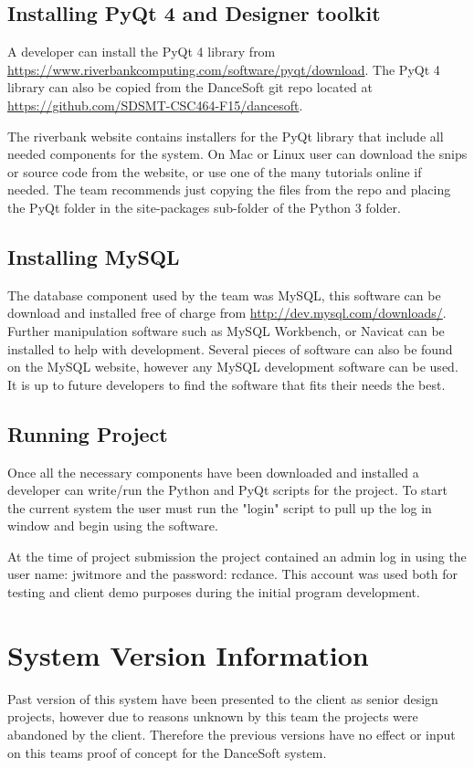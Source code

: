 \subsection{Installing PyQt 4 and Designer toolkit }

A developer can install the PyQt 4 library from \url{https://www.riverbankcomputing.com/software/pyqt/download}. The PyQt 4 library can also be copied from the DanceSoft git repo located at \url{https://github.com/SDSMT-CSC464-F15/dancesoft}.

The riverbank website contains installers for the PyQt library that include all needed components for the system. On Mac or Linux user can download the snips or source code from the website, or use one of the many tutorials online if needed. The team recommends just copying the files from the repo and placing the PyQt folder in the site-packages sub-folder of the Python 3 folder. 

\subsection{Installing MySQL}
The database component used by the team was MySQL, this software can be download and installed free of charge from \url{http://dev.mysql.com/downloads/}. Further manipulation software such as MySQL Workbench, or Navicat can be installed to help with development. Several pieces of  software can also be found on the MySQL website, however any MySQL development software can be used. It is up to future developers to find the software that fits their needs the best.

\subsection{Running Project}
Once all the necessary components have been downloaded and installed a developer can write/run the Python and PyQt scripts for the project. To start the current system the user must run the "login" script to pull up the log in window and begin using the software. 

At the time of project submission the project contained an admin log in using the user name: jwitmore and the password: rcdance. This account was used both for testing and client demo purposes during the initial program development.

\section{System Version Information}
Past version of this system have been presented to the client as senior design projects, however due to reasons unknown by this team the projects were abandoned by the client. Therefore the previous versions have no effect or input on this teams proof of concept for the DanceSoft system. 

